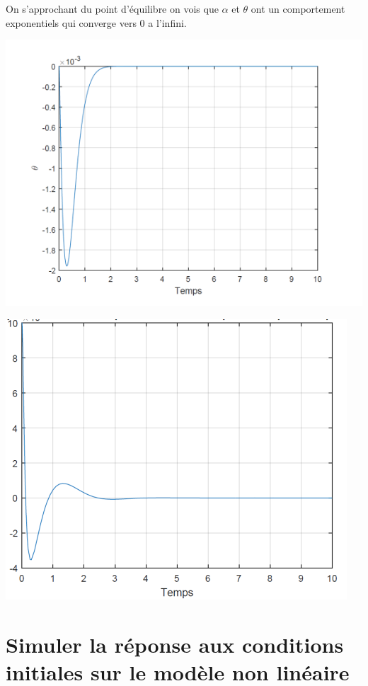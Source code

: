 \documentclass[12pt, a4paper, openany]{report}
\begin{document}
     On s’approchant du point d’équilibre on vois que  $\alpha$ et $\theta$ ont un comportement exponentiels qui converge vers 0 a l'infini.\\ 

\begin{center}
{\includegraphics[scale=0.6]{figue1.png}} 
\label{figue1}
\quad

{\includegraphics[scale=0.6]{figue2.png}} 
\label{figue2}
\end{center}

    \section{Simuler la réponse aux conditions initiales sur le modèle non linéaire}
   
\end{document}
